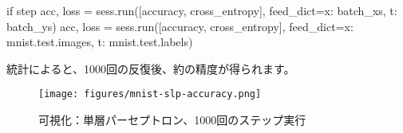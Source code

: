 \begin{content}
\begin{leftbar}
\begin{python}
    if step %
      acc, loss = sess.run([accuracy, cross_entropy], 
        feed_dict={x: batch_xs, t: batch_ys})
      acc, loss = sess.run([accuracy, cross_entropy], 
        feed_dict={x: mnist.test.images, t: mnist.test.labels}) 
\end{python}
\end{leftbar}

統計によると、1000回の反復後、約の精度が得られます。

\begin{figure}[H]
\centering
\texttt{[image: figures/mnist-slp-accuracy.png]}
\caption{可視化：単層パーセプトロン、1000回のステップ実行}
 \label{fig:mnist-slp-accuracy}
\end{figure}

\end{content}
